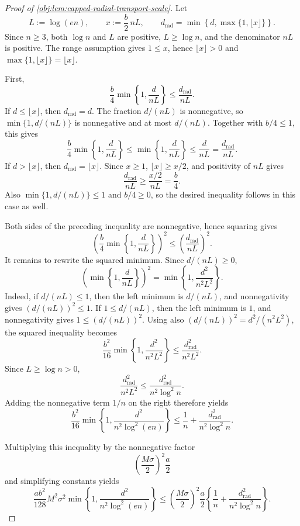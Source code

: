 \documentclass[11pt]{article}
\begin{document}
\begin{proof}[Proof of \cref{obj:lem:capped-radial-transport-scale}]
Let
\[
L:=\log(en),
\qquad
x:=\frac b2\,nL,
\qquad
d_{\mathrm{rad}}
=
\min\left\{d,\max\{1,\lfloor x\rfloor\}\right\}.
\]
Since \(n\ge3\), both \(\log n\) and \(L\) are positive, \(L\ge\log n\), and the denominator \(nL\) is positive. The range assumption gives \(1\le x\), hence \(\lfloor x\rfloor>0\) and \(\max\{1,\lfloor x\rfloor\}=\lfloor x\rfloor\). %

First,
\[
\frac b4\min\left\{1,\frac d{nL}\right\}
\le
\frac{d_{\mathrm{rad}}}{nL}.
\]
If \(d\le\lfloor x\rfloor\), then \(d_{\mathrm{rad}}=d\). The fraction \(d/(nL)\) is nonnegative, so \(\min\{1,d/(nL)\}\) is nonnegative and at most \(d/(nL)\). Together with \(b/4\le1\), this gives
\[
\frac b4\min\left\{1,\frac d{nL}\right\}
\le
\min\left\{1,\frac d{nL}\right\}
\le
\frac d{nL}
=
\frac{d_{\mathrm{rad}}}{nL}.
\]
If \(d>\lfloor x\rfloor\), then \(d_{\mathrm{rad}}=\lfloor x\rfloor\). Since \(x\ge1\), \(\lfloor x\rfloor\ge x/2\), and positivity of \(nL\) gives
\[
\frac{d_{\mathrm{rad}}}{nL}
\ge
\frac{x/2}{nL}
=
\frac b4.
\]
Also \(\min\{1,d/(nL)\}\le1\) and \(b/4\ge0\), so the desired inequality follows in this case as well. %

Both sides of the preceding inequality are nonnegative, hence squaring gives
\[
\left(
\frac b4\min\left\{1,\frac d{nL}\right\}
\right)^2
\le
\left(\frac{d_{\mathrm{rad}}}{nL}\right)^2.
\]
It remains to rewrite the squared minimum. Since \(d/(nL)\ge0\),
\[
\left(\min\left\{1,\frac d{nL}\right\}\right)^2
=
\min\left\{1,\frac{d^2}{n^2L^2}\right\}.
\]
Indeed, if \(d/(nL)\le1\), then the left minimum is \(d/(nL)\), and nonnegativity gives \((d/(nL))^2\le1\). If \(1\le d/(nL)\), then the left minimum is \(1\), and nonnegativity gives \(1\le(d/(nL))^2\). Using also \((d/(nL))^2=d^2/(n^2L^2)\), the squared inequality becomes
\[
\frac{b^2}{16}
\min\left\{1,\frac{d^2}{n^2L^2}\right\}
\le
\frac{d_{\mathrm{rad}}^2}{n^2L^2}.
\]
Since \(L\ge\log n>0\),
\[
\frac{d_{\mathrm{rad}}^2}{n^2L^2}
\le
\frac{d_{\mathrm{rad}}^2}{n^2\log^2 n}.
\]
Adding the nonnegative term \(1/n\) on the right therefore yields
\[
\frac{b^2}{16}
\min\left\{1,\frac{d^2}{n^2\log^2(en)}\right\}
\le
\frac1n+
\frac{d_{\mathrm{rad}}^2}{n^2\log^2 n}.
\]

Multiplying this inequality by the nonnegative factor
\[
\left(\frac{M\sigma}{2}\right)^2\frac a2
\]
and simplifying constants yields
\[
\frac{ab^2}{128}M^2\sigma^2
\min\left\{1,\frac{d^2}{n^2\log^2(en)}\right\}
\le
\left(\frac{M\sigma}{2}\right)^2
\frac a2
\left\{
\frac1n+
\frac{d_{\mathrm{rad}}^2}{n^2\log^2 n}
\right\}.
\]
\end{proof}
\end{document}
